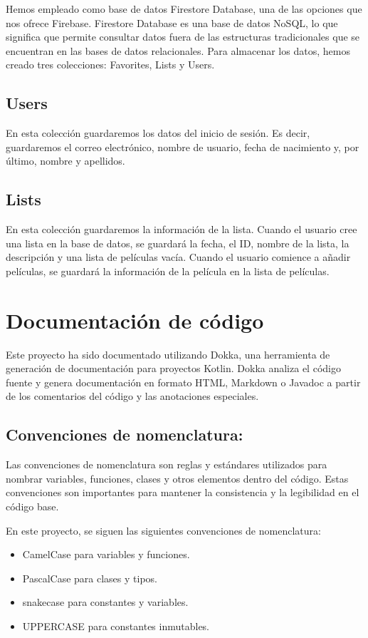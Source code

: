 \documentclass{article}
\begin{document}
    Hemos empleado como base de datos Firestore Database, una de las opciones que nos ofrece Firebase. Firestore Database es una base de datos NoSQL, lo que significa que permite consultar datos fuera de las estructuras tradicionales que se encuentran en las bases de datos relacionales. Para almacenar los datos, hemos creado tres colecciones: Favorites, Lists y Users.
    
    \subsection{Users}
    En esta colección guardaremos los datos del inicio de sesión. Es decir, guardaremos el correo electrónico, nombre de usuario, fecha de nacimiento y, por último, nombre y apellidos.
    
    \subsection{Lists}
    En esta colección guardaremos la información de la lista. Cuando el usuario cree una lista en la base de datos, se guardará la fecha, el ID, nombre de la lista, la descripción y una lista de películas vacía. Cuando el usuario comience a añadir películas, se guardará la información de la película en la lista de películas.

\section{Documentación de código}

Este proyecto ha sido documentado utilizando Dokka, una herramienta de generación de documentación para proyectos Kotlin. Dokka analiza el código fuente y genera documentación en formato HTML, Markdown o Javadoc a partir de los comentarios del código y las anotaciones especiales.

\subsection{Convenciones de nomenclatura:}

    Las convenciones de nomenclatura son reglas y estándares utilizados para nombrar variables, funciones, clases y otros elementos dentro del código. Estas convenciones son importantes para mantener la consistencia y la legibilidad en el código base.
    
    En este proyecto, se siguen las siguientes convenciones de nomenclatura:

    \begin{itemize}
        \item CamelCase para variables y funciones.
        \item PascalCase para clases y tipos.
        \item snake\textunderscore case para constantes y variables.
        \item UPPERCASE para constantes inmutables.
    \end{itemize}
    
\end{document}

